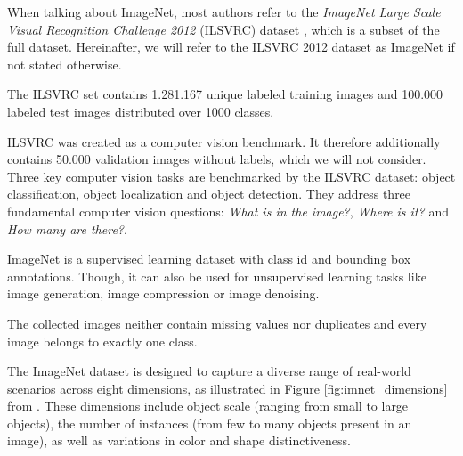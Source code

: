    When talking about ImageNet, most authors refer to the \textit{ImageNet Large Scale Visual Recognition Challenge 2012} (ILSVRC) dataset \cite{ILSVRC15}, which is a subset of the full dataset. Hereinafter, we will refer to the ILSVRC 2012 dataset as ImageNet if not stated otherwise.

    The ILSVRC set contains 1.281.167 unique labeled training images and 100.000 labeled test images distributed over 1000 classes.

    ILSVRC was created as a computer vision benchmark. It therefore additionally contains 50.000 validation images without labels, which we will not consider.
    Three key computer vision tasks are benchmarked by the ILSVRC dataset: object classification, object localization and object detection.
    They address three fundamental computer vision questions: \textit{What is in the image?}, \textit{Where is it?} and \textit{How many are there?}.

    ImageNet is a supervised learning dataset with class id and bounding box annotations. Though, it can also be used for unsupervised learning tasks like image generation, image compression or image denoising.

    The collected images neither contain missing values nor duplicates and every image belongs to exactly one class.

    The ImageNet dataset is designed to capture a diverse range of real-world scenarios across eight dimensions, as illustrated in Figure \ref{fig:imnet_dimensions} from \cite{imagenet_breakdown}. These dimensions include object scale (ranging from small to large objects), the number of instances (from few to many objects present in an image), as well as variations in color and shape distinctiveness.

